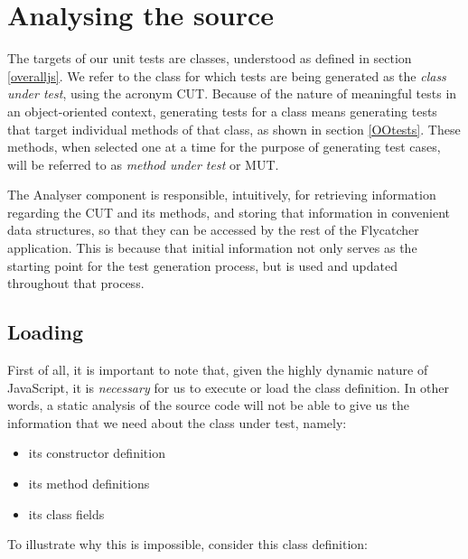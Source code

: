 \chapter{Analysing the source}
\label{analyser}
The targets of our unit tests are classes, understood as defined in section \ref{overalljs}. We refer to the class for which tests are being generated as the \emph{class under test}, using the acronym CUT. Because of the nature of meaningful tests in an object-oriented context, generating tests for a class means generating tests that target individual methods of that class, as shown in section \ref{OOtests}. These methods, when selected one at a time for the purpose of generating test cases, will be referred to as \emph{method under test} or MUT.

The \textsf{Analyser} component is responsible, intuitively, for retrieving information regarding the CUT and its methods, and storing that information in convenient data structures, so that they can be accessed by the rest of the \textsf{Flycatcher} application. This is because that initial information not only serves as the starting point for the test generation process, but is used and updated throughout that process.


\section{Loading}

First of all, it is important to note that, given the highly dynamic nature of JavaScript, it is \emph{necessary} for us to execute or load the class definition. In other words, a static analysis of the source code will not be able to give us the information that we need about the class under test, namely:

\begin{itemize}
   \item its constructor definition
   \item its method definitions
   \item its class fields
\end{itemize}

To illustrate why this is impossible, consider this class definition:

